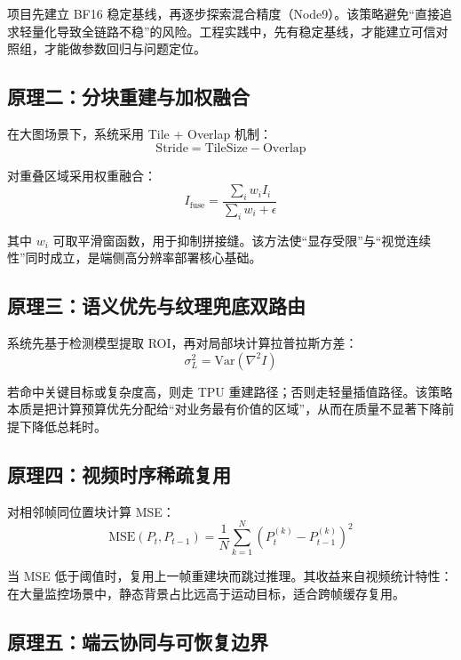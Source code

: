 \documentclass[12pt,a4paper]{ctexart}
\begin{document}
项目先建立 BF16 稳定基线，再逐步探索混合精度（Node9）。该策略避免“直接追求轻量化导致全链路不稳”的风险。工程实践中，先有稳定基线，才能建立可信对照组，才能做参数回归与问题定位。

\subsection{原理二：分块重建与加权融合}

在大图场景下，系统采用 Tile + Overlap 机制：
\begin{equation}
\text{Stride} = \text{TileSize} - \text{Overlap}
\end{equation}

对重叠区域采用权重融合：
\begin{equation}
I_{\text{fuse}} = \frac{\sum_i w_i I_i}{\sum_i w_i + \epsilon}
\end{equation}

其中 $w_i$ 可取平滑窗函数，用于抑制拼接缝。该方法使“显存受限”与“视觉连续性”同时成立，是端侧高分辨率部署核心基础。

\subsection{原理三：语义优先与纹理兜底双路由}

系统先基于检测模型提取 ROI，再对局部块计算拉普拉斯方差：
\begin{equation}
\sigma_L^2 = \mathrm{Var}(\nabla^2 I)
\end{equation}

若命中关键目标或复杂度高，则走 TPU 重建路径；否则走轻量插值路径。该策略本质是把计算预算优先分配给“对业务最有价值的区域”，从而在质量不显著下降前提下降低总耗时。

\subsection{原理四：视频时序稀疏复用}

对相邻帧同位置块计算 MSE：
\begin{equation}
\mathrm{MSE}(P_t, P_{t-1}) = \frac{1}{N}\sum_{k=1}^{N}(P_t^{(k)}-P_{t-1}^{(k)})^2
\end{equation}

当 MSE 低于阈值时，复用上一帧重建块而跳过推理。其收益来自视频统计特性：在大量监控场景中，静态背景占比远高于运动目标，适合跨帧缓存复用。

\subsection{原理五：端云协同与可恢复边界}
\end{document}
